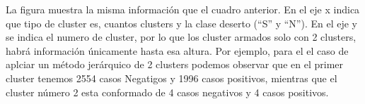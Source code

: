 \documentclass[]{article}
\begin{document}
La figura muestra la misma información que el cuadro anterior. En el eje
x indica que tipo de cluster es, cuantos clusters y la clase deserto
(``S'' y ``N''). En el eje y se indica el numero de cluster, por lo que
los cluster armados solo con 2 clusters, habrá información únicamente
hasta esa altura. Por ejemplo, para el el caso de aplciar un método
jerárquico de 2 clusters podemos observar que en el primer cluster
tenemos 2554 casos Negatigos y 1996 casos positivos, mientras que el
cluster número 2 esta conformado de 4 casos negativos y 4 casos
positivos.
\end{document}
